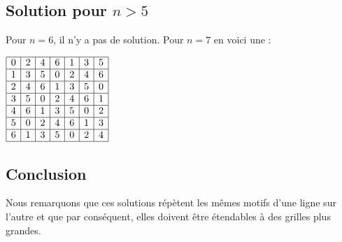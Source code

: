 \subsection{Solution pour $n > 5$}

Pour $n = 6$, il n'y a pas de solution. Pour $n = 7$ en voici une :

$\begin{array}{|c|c|c|c|c|c|c|}
\hline
0 & 2 & 4 & 6 & 1 & 3 & 5 \\ \hline
1 & 3 & 5 & 0 & 2 & 4 & 6 \\ \hline
2 & 4 & 6 & 1 & 3 & 5 & 0 \\ \hline
3 & 5 & 0 & 2 & 4 & 6 & 1 \\ \hline
4 & 6 & 1 & 3 & 5 & 0 & 2 \\ \hline
5 & 0 & 2 & 4 & 6 & 1 & 3 \\ \hline
6 & 1 & 3 & 5 & 0 & 2 & 4 \\ \hline
\end{array}$

\subsection{Conclusion}
Nous remarquons que ces solutions répètent les mêmes motifs d'une ligne sur l'autre et que par conséquent, elles doivent être étendables à des grilles plus grandes.



